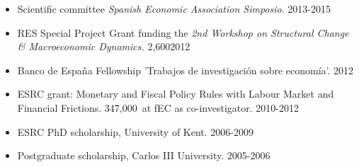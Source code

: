 \documentclass[margin, 11pt]{res} %
\begin{document}
\begin{resume}
\begin{itemize}
\item Scientific committee \emph{Spanish Economic Association Simposio}. \hfill 2013-2015
\item RES Special Project Grant funding the \emph{2nd Workshop on Structural Change \& Macroeconomic Dynamics.} 2,600\textsterling \hfill 2012
\item Banco de Espa\~{n}a Fellowship 'Trabajos de investigaci\'{o}n sobre econom\'{i}a'. \hfill 2012
\item ESRC grant: Monetary and Fiscal Policy Rules with Labour Market and Financial Frictions. 347,000\textsterling$\,$  at fEC  as co-investigator. \hfill 2010-2012 
\item ESRC PhD scholarship, University of Kent. \hfill 2006-2009
\item Postgraduate scholarship, Carlos III University. \hfill 2005-2006
\end{itemize}



\end{resume}
\end{document}
